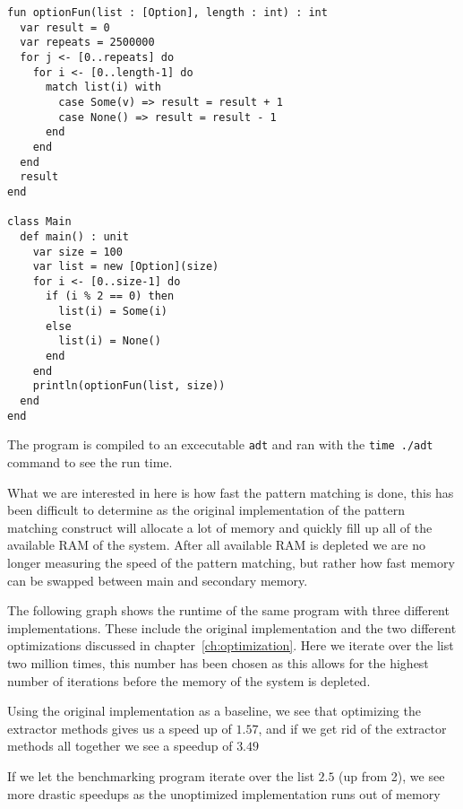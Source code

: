 \documentclass[10pt]{report}
\def\code#1{\texttt{#1}} %
\begin{document}
{\begin{lstlisting}[language=encore,caption={Program used for benchmarking},label=AST]
fun optionFun(list : [Option], length : int) : int
  var result = 0
  var repeats = 2500000
  for j <- [0..repeats] do
    for i <- [0..length-1] do
      match list(i) with
        case Some(v) => result = result + 1
        case None() => result = result - 1
      end
    end
  end
  result
end

class Main
  def main() : unit
    var size = 100
    var list = new [Option](size)
    for i <- [0..size-1] do
      if (i % 2 == 0) then
        list(i) = Some(i)
      else
        list(i) = None()
      end
    end
    println(optionFun(list, size))
  end
end
\end{lstlisting}
\par{The program is compiled to an excecutable \code{adt} and ran with the \code{time ./adt} command to see the run time.}
\par{What we are interested in here is how fast the pattern matching is done, this has been difficult to determine as the original implementation of the pattern matching construct will allocate a lot of memory and quickly fill up all of the available RAM of the system. After all available RAM is depleted we are no longer measuring the speed of the pattern matching, but rather how fast memory can be swapped between main and secondary memory.}
\par{The following graph shows the runtime of the same program with three different implementations. These include the original implementation and the two different optimizations discussed in chapter~\ref{ch:optimization}. Here we iterate over the list two million times, this number has been chosen as this allows for the highest number of iterations before the memory of the system is depleted.}

\par{Using the original implementation as a baseline, we see that optimizing the extractor methods gives us a speed up of $1.57$, and if we get rid of the extractor methods all together we see a speedup of $3.49$}
\par{If we let the benchmarking program iterate over the list $2.5$ (up from 2), we see more drastic speedups as the unoptimized implementation runs out of memory}

}
\end{document}

